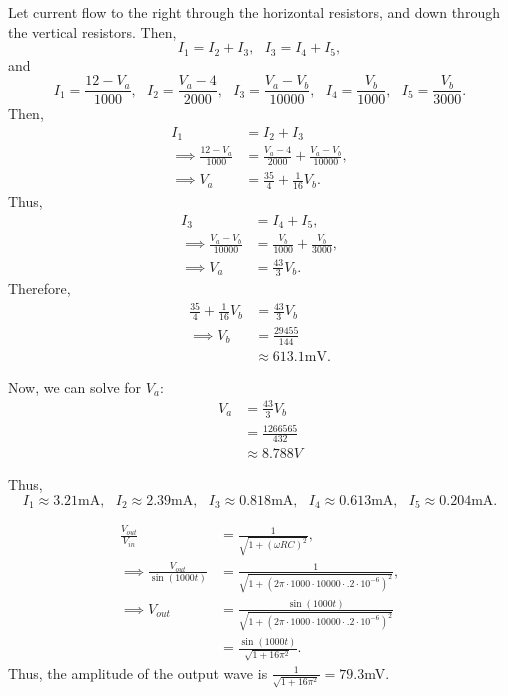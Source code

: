 \documentclass{article}
\begin{document}
\pagecolor{black}
\color{white}

Let current flow to the right through the horizontal resistors, and down through the vertical resistors.
Then, $$I_1 = I_2 + I_3, ~~~ I_3 = I_4 + I_5,$$
and $$I_{1} = \frac{12-V_{a}}{1000}, ~~~ I_{2} = \frac{V_{a}-4}{2000}, ~~~ I_{3} = \frac{V_{a}-V_{b}}{10000}, ~~~ I_{4} = \frac{V_{b}}{1000}, ~~~ I_{5} = \frac{V_{b}}{3000}.$$
Then,
\begin{align*}
    I_{1}&=I_{2}+I_{3} \\
    \implies \frac{12-V_{a}}{1000}&=\frac{V_{a}-4}{2000}+\frac{V_{a}-V_{b}}{10000}, \\
    \implies V_a &= \frac{35}4 + \frac{1}{16}V_b.
\end{align*}
Thus,
\begin{align*}
    I_3 &= I_4 + I_5, \\
    \implies \frac{V_{a}-V_{b}}{10000}&=\frac{V_{b}}{1000}+\frac{V_{b}}{3000}, \\
    \implies V_{a}&=\frac{43}{3}V_{b}.
\end{align*}
Therefore,
\begin{align*}
    \frac{35}4 + \frac{1}{16}V_b &= \frac{43}{3}V_{b} \\
    \implies V_b &= \frac{29455}{144} \\
    &\approx 613.1\text{mV}.
\end{align*}

Now, we can solve for $V_a$:
\begin{align*}
    V_a &= \frac{43}3V_b \\
        &= \frac{1266565}{432} \\
        &\approx 8.788V
\end{align*}

Thus, $$I_{1} \approx 3.21\text{mA}, ~~~ I_{2} \approx 2.39\text{mA}, ~~~ I_{3} \approx 0.818\text{mA}, ~~~ I_{4} \approx 0.613\text{mA}, ~~~ I_{5} \approx 0.204\text{mA}.$$

\newpage{}

\begin{align*}
    \frac{V_{out}}{V_{in}} &= \frac{1}{\sqrt{1+(\omega RC)^2}}, \\
    \implies \frac{V_{out}}{\sin\left(1000t\right)} &= \frac{1}{\sqrt{1+\left(2\pi\cdot1000\cdot10000\cdot.2\cdot10^{-6}\right)^{2}}}, \\
    \implies V_{out} &= \frac{\sin\left(1000t\right)}{\sqrt{1+\left(2\pi\cdot1000\cdot10000\cdot.2\cdot10^{-6}\right)^{2}}} \\
            &= \frac{\sin\left(1000t\right)}{\sqrt{1+16\pi^{2}}}.
\end{align*}
Thus, the amplitude of the output wave is $\frac{1}{\sqrt{1+16\pi^{2}}} = 79.3$mV.
\end{document}
